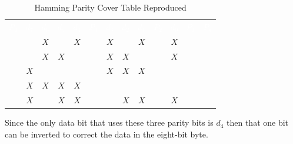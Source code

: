 \begin{table}[H]
  \sffamily
  \newcommand{\head}[1]{\textcolor{white}{\textbf{#1}}}		
  \begin{center}
    \begin{tabular}{ccccccccccccc} 
      \rowcolor{black!75}
      \head{$ P_4 $} & \head{$ d_7 $} & \head{$ d_6 $} &
      \head{$ d_5 $} & \head{$ d_4 $} & \head{$ P_3 $} &
      \head{$ d_3 $} & \head{$ d_2 $} & \head{$ d_1 $} &
      \head{$ P_2 $} & \head{$ d_0 $} & \head{$ P_1 $} &
      \head{$ P_0 $} \\
      \color{gray}{$ 0 $} & \color{gray}{$ 0 $} & $ X $ &
      \color{gray}{$ 0 $} & \cellcolor{yellow!70!white}$ X $ & \color{gray}{$ 0 $} &
      $ X $ & \color{gray}{$ 0 $} & $ X $ &
      \color{gray}{$ 0 $} & $ X $ & \color{gray}{$ 0 $} &
      \color{red}{$ P $} \\
      \color{gray}{$ 0 $} & \color{gray}{$ 0 $} & $ X $ &
      $ X $ & \color{gray}{$ 0 $} & \color{gray}{$ 0 $} &
      $ X $ & $ X $ & \color{gray}{$ 0 $} &
      \color{gray}{$ 0 $} & $ X $ & \color{red}{$ P $} &
      \color{gray}{$ 0 $} \\
      \color{gray}{$ 0 $} & $ X $ & \color{gray}{$ 0 $} &
      \color{gray}{$ 0 $} & \color{gray}{$ 0 $} & \color{gray}{$ 0 $} &
      $ X $ & $ X $ & $ X $ &
      \color{red}{$ P $} & \color{gray}{$ 0 $} & \color{gray}{$ 0 $} &
      \color{gray}{$ 0 $} \\
      \color{gray}{$ 0 $} & $ X $ & $ X $ &
      $ X $ & \cellcolor{yellow!70!white}$ X $ & \color{red}{$ P $} &
      \color{gray}{$ 0 $} & \color{gray}{$ 0 $} & \color{gray}{$ 0 $} &
      \color{gray}{$ 0 $} & \color{gray}{$ 0 $} & \color{gray}{$ 0 $} &
      \color{gray}{$ 0 $} \\
      \color{red}{$ P $} & $ X $ & \color{gray}{$ 0 $} &
      $ X $ & \cellcolor{yellow!70!white}$ X $ & \color{gray}{$ 0 $} &
      \color{gray}{$ 0 $} & $ X $ & $ X $ &
      \color{gray}{$ 0 $} & $ X $ & \color{gray}{$ 0 $} &
      \color{gray}{$ 0 $} 
    \end{tabular}
  \end{center}
  \caption{Hamming Parity Cover Table Reproduced}
  \label{cl:tab:hamming_parity_cover_table_reproduced}
\end{table}

Since the only data bit that uses these three parity bits is $ d_4 $ then that one bit can be inverted to correct the data in the eight-bit byte.

